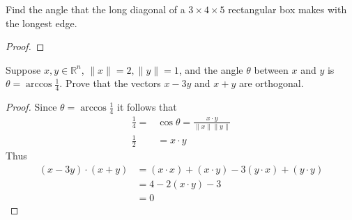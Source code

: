 \begin{exercise} \label{1.2.4}
    Find the angle that the long diagonal of a \( 3 \times 4 \times 5 \) rectangular box makes with the longest edge.
    
    \begin{proof}
        
    \end{proof}
\end{exercise} %

\begin{exercise} \label{e1.2.5}
    Suppose \( x, y \in \mathbb{R}^n \), \( \lVert x \rVert =2, \lVert y \rVert =1 \), and the angle \( \theta \) between \( x \) and \( y \) is \( \theta = \arccos{\frac{1}{4}} \). Prove that the vectors \( x-3y \) and \( x+y \) are orthogonal.

    \begin{proof}
        Since \( \theta = \arccos{\frac{1}{4}} \) it follows that
        \begin{align*}
        \frac{1}{4} = &\cos{\theta} = \frac{x \cdot y}{\lVert x \rVert \lVert y \rVert} \\
        \frac{1}{2} &= x \cdot y
        \end{align*}
        Thus
        \begin{align*}
            (x-3y) \cdot (x+y) &= (x \cdot x) + (x \cdot y) - 3(y \cdot x) + (y \cdot y)\\
            &= 4 - 2 (x \cdot y) -3 \\
            &= 0
        \end{align*}
    \end{proof}
\end{exercise} %

